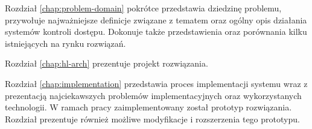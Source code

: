 Rozdział \ref{chap:problem-domain} pokrótce przedstawia dziedzinę problemu, przywołuje najważniejsze definicje związane z tematem oraz ogólny opis działania systemów kontroli dostępu. Dokonuje także przedstawienia oraz porównania kilku istniejących na rynku rozwiązań.

Rozdział \ref{chap:hl-arch} prezentuje projekt rozwiązania.

Rozdział \ref{chap:implementation} przedstawia proces implementacji systemu wraz z prezentacją najciekawszych problemów implementacyjnych oraz wykorzystanych technologii. W ramach pracy zaimplementowany został prototyp rozwiązania. Rozdział prezentuje również możliwe modyfikacje i rozszerzenia tego prototypu.